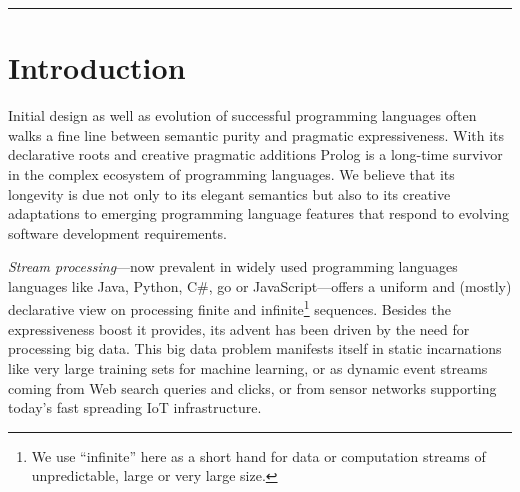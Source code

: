 \documentclass{new_tlp}
\begin{document}
\begin{comment}
\begin{abstract}
Lazy stream generators provide a unified interface to stateful computations, I/O operations as well as algorithms producing finite or infinite sequences. 

As a special instance, we introduce answer stream generators that 
encapsulate the work of coroutining first-class logic engines and support interoperation between forward recursive {\em AND-streams} and backtracking-generated {\em OR-streams}. 

Stream generators are exposed to the application programmer either through an abstract sequence manipulation API or as lazy lists. We define an algebra of stream generator operations that extends Prolog via an embedded language interpreter providing a compact notation for composition mechanisms and supports moving between isomorphic sequence representations.
\end{abstract}
\end{comment}
\hrule


\section{Introduction}

Initial design as well as evolution of successful programming languages often walks a fine line between semantic purity and pragmatic expressiveness. With its declarative roots and creative pragmatic additions Prolog is a long-time survivor in the complex ecosystem of programming languages. We believe that its longevity is due not only to its elegant semantics but also to its creative adaptations to emerging programming language features that respond to evolving software development requirements.

\emph{Stream processing}---now prevalent in widely used programming languages
languages like Java, Python, C\#, go or JavaScript---offers a uniform and
(mostly) declarative view on processing finite and infinite\footnote{We use
``infinite'' here as a short hand for data or computation streams of
unpredictable, large or very large size.} sequences. Besides the expressiveness
boost it provides, its advent has been driven by the need for processing big
data. This big data problem manifests itself in static incarnations like very
large training sets for machine learning, or as dynamic event streams coming
from Web search queries and clicks, or from sensor networks supporting today's
fast spreading IoT infrastructure. 
\end{document}
